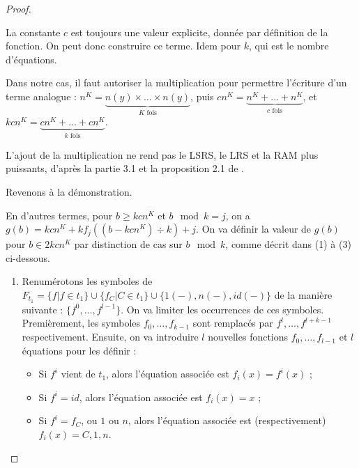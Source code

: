\begin{appendices}
\begin{proof}
\begin{remark}
				La constante $c$ est toujours une valeur explicite, donnée par définition de la fonction. On peut donc construire ce terme. Idem pour $k$, qui est le nombre d'équations. 
				
				Dans notre cas, il faut autoriser la multiplication pour permettre l'écriture d'un terme analogue : $n^K = \underset{K \text{ fois}}{\underbrace{n(y) \times \dots \times n(y)}}$, puis $cn^K = \underset{c \text{ fois}}{\underbrace{n^K + \dots + n^K}}$, et $kcn^K = \underset{k \text{ fois}}{\underbrace{cn^K + \dots + cn^K}}$. 
				
				L'ajout de la multiplication ne rend pas le LSRS, le LRS et la RAM plus puissants, d'après la partie 3.1 et la proposition 2.1 de \cite{GrandjeanSchwentick2002}. 
			\end{remark}
			
			\espace
			
			Revenons à la démonstration.
			
			En d'autres termes, pour $b \geqslant kcn^K$ et $b \mod{k} = j$, on a $g(b) = kcn^K + k f_j\left( (b-kcn^K) \div k \right) + j$.
			On va définir la valeur de $g(b)$ pour $b \in 2kcn^K$ par distinction de cas sur $b \mod{k}$, comme décrit dans (1) à (3) ci-dessous.
			
			\begin{enumerate}[itemsep=-1mm,leftmargin=2cm]
				\item  
				Renumérotons les symboles de $F_{t_1} = \{f | f \in t_1\} \cup \{f_C | C \in t_1\} \cup \{1(-), n(-), id(-)\}$ de la manière suivante : $\{ f^0, \dots, f^{l-1} \}$. On va limiter les occurrences de ces symboles. Premièrement, les symboles $f_0, \dots, f_{k-1}$ sont remplacés par $f^{l}, \dots, f^{l+k-1}$ respectivement. Ensuite, on va introduire $l$ nouvelles fonctions $f_0, \dots, f_{l-1}$ et $l$ équations pour les définir :
				
				\begin{itemize}[itemsep=-1mm,leftmargin=1cm]
					\item	Si $f^i$ vient de $t_1$, alors l'équation associée est $f_i(x) = f^i(x)$ ;
					\item 	Si $f^i = id$, alors l'équation associée est $f_i(x) = x$ ;
					\item 	Si $f^i = f_C$, ou $1$ ou $n$, alors l'équation associée est (respectivement) $f_i(x) = C, 1, n$. 
				\end{itemize}
				
				

\end{enumerate}
\end{proof}
\end{appendices}

